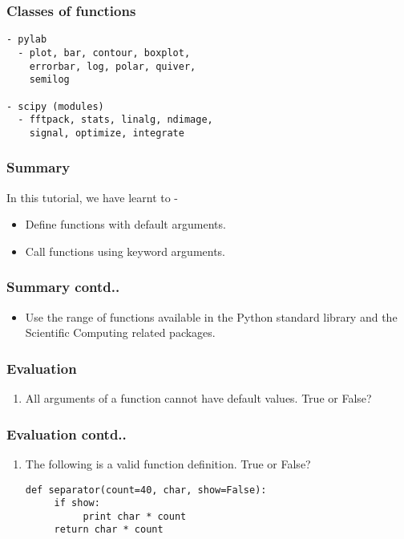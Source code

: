 \documentclass[17pt,compress]{beamer}
\newcounter{saveenumi}
\newcommand{\seti}{\setcounter{saveenumi}{\value{enumi}}}
\newcommand{\conti}{\setcounter{enumi}{\value{saveenumi}}}
\begin{document}
\begin{frame}[fragile]
\frametitle{Classes of functions}
\label{sec-11}

\lstset{language=Python}
\begin{small}
\begin{lstlisting}
- pylab
  - plot, bar, contour, boxplot, 
    errorbar, log, polar, quiver, 
    semilog

- scipy (modules)
  - fftpack, stats, linalg, ndimage, 
    signal, optimize, integrate
\end{lstlisting}
\end{small}
\end{frame}
\begin{frame}
\frametitle{Summary}
\label{sec-12.1}

 In this tutorial, we have learnt to -

\begin{itemize}
\item Define functions with default arguments.
\item Call functions using keyword arguments.
\end{itemize}
\end{frame}
\begin{frame}
\frametitle{Summary contd..}
\label{sec-12.2}

\begin{itemize}
\item Use the range of functions available in the Python standard library 
   and the Scientific Computing related packages.
\end{itemize}
\end{frame}
\begin{frame}[fragile]
\frametitle{Evaluation}
\label{sec-13.1}

\begin{enumerate}
\item All arguments of a function cannot have default values.
 True or False?
\seti
\end{enumerate}
\end{frame}
\begin{frame}[fragile]
\frametitle{Evaluation contd..}
\label{sec-13.2}

\begin{enumerate}
\conti
\item The following is a valid function definition. True or False? \pause
\lstset{language=Python}
\begin{footnotesize}
\begin{lstlisting}
def separator(count=40, char, show=False):
     if show:
          print char * count
     return char * count
\end{lstlisting}
\end{footnotesize}
\seti
\end{enumerate}
\end{frame}
\end{document}

